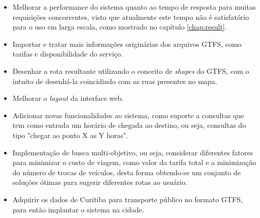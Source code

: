 \begin{itemize}
	\item Melhorar a performance do sistema quanto ao tempo de resposta para muitas requisições concorrentes, visto que atualmente este tempo não é satisfatório para 	o uso em larga escala, como mostrado no capítulo \ref{chap:result}.
	\item Importar e tratar mais informações originárias dos arquivos GTFS, como tarifas e disponibilidade do serviço.
	\item Desenhar a rota resultante utilizando o conceito de \emph{shapes} do GTFS, com o intuito de desenhá-la coincidindo com as ruas presentes no mapa.
	\item Melhorar o \emph{layout} da interface web.
	\item Adicionar novas funcionalidades ao sistema, como suporte a consultas que tem como entrada um horário de chegada ao destino, ou seja, consultas do tipo 			"chegar ao ponto X as Y horas".
	\item Implementação de busca multi-objetivo, ou seja, considerar diferentes fatores para minimizar o custo de viagem, como valor da tarifa total e a minimização 		do número de trocas de veículos, desta forma obtendo-se um conjunto de soluções ótimas para sugerir diferentes rotas ao usuário.
	\item Adquirir os dados de Curitiba para transporte público no formato GTFS, para então implantar o sistema na cidade.
\end{itemize}